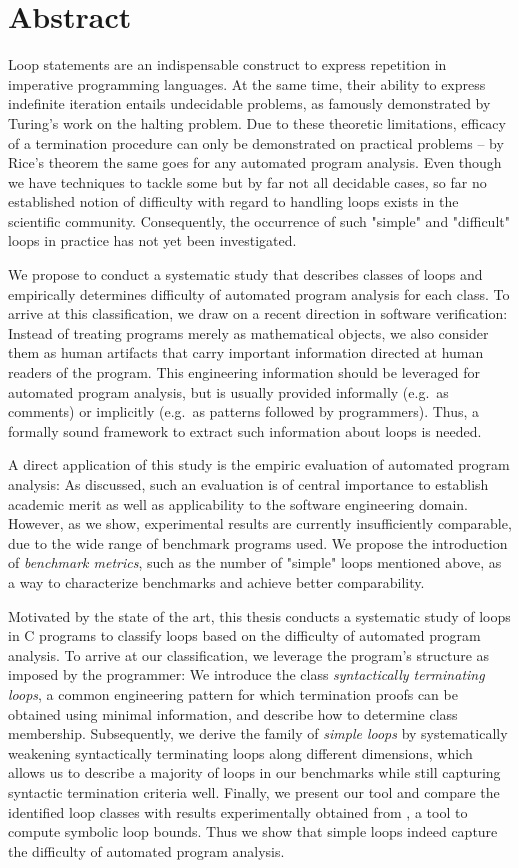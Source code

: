 \chapter*{Abstract}

Loop statements are an indispensable construct to express repetition in imperative programming languages. At the same time, their ability to express indefinite iteration entails undecidable problems, as famously demonstrated by Turing's work on the halting problem. Due to these theoretic limitations, efficacy of a termination procedure can only be demonstrated on practical problems -- by Rice's theorem the same goes for any automated program analysis. Even though we have techniques to tackle some but by far not all decidable cases, so far no established notion of difficulty with regard to handling loops exists in the scientific community. Consequently, the occurrence of such "simple" and "difficult" loops in practice has not yet been investigated.

We propose to conduct a systematic study that describes classes of loops and empirically determines difficulty of automated program analysis for each class. To arrive at this classification, we draw on a recent direction in software verification: Instead of treating programs merely as mathematical objects, we also consider them as human artifacts that carry important information directed at human readers of the program. This engineering information should be leveraged for automated program analysis, but is usually provided informally (e.g.\ as comments) or implicitly (e.g.\ as patterns followed by programmers). Thus, a formally sound framework to extract such information about loops is needed.

A direct application of this study is the empiric evaluation of automated program analysis: As discussed, such an evaluation is of central importance to establish academic merit as well as applicability to the software engineering domain. However, as we show, experimental results are currently insufficiently comparable, due to the wide range of benchmark programs used. We propose the introduction of \emph{benchmark metrics}, such as the number of "simple" loops mentioned above, as a way to characterize benchmarks and achieve better comparability.

Motivated by the state of the art, this thesis conducts a systematic study of loops in C programs to classify loops based on the difficulty of automated program analysis. To arrive at our classification, we leverage the program's structure as imposed by the programmer: We introduce the class \emph{syntactically terminating loops}, a common engineering pattern for which termination proofs can be obtained using minimal information, and describe how to determine class membership. Subsequently, we derive the family of \emph{simple loops} by systematically weakening syntactically terminating loops along different dimensions, which allows us to describe a majority of loops in our benchmarks while still capturing syntactic termination criteria well. Finally, we present our tool \sloopy{} and compare the identified loop classes with results experimentally obtained from \loopus{}, a tool to compute symbolic loop bounds. Thus we show that simple loops indeed capture the difficulty of automated program analysis.
